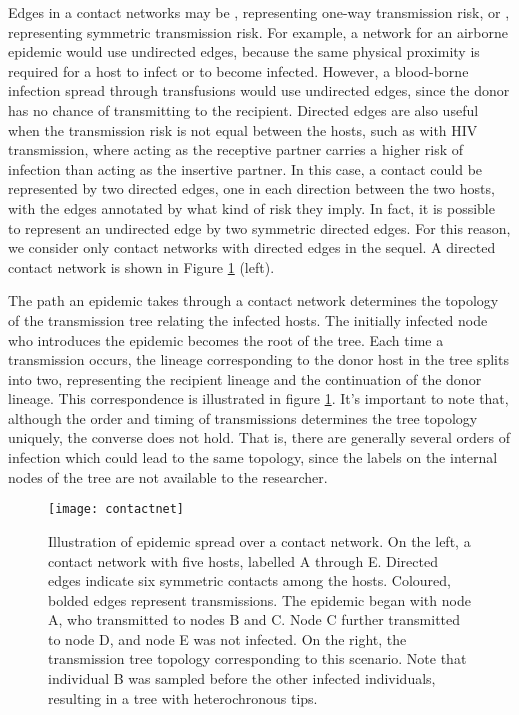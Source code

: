 Edges in a contact networks may be , representing one-way
transmission risk, or , representing symmetric transmission
risk. For example, a network for an airborne epidemic would use undirected
edges, because the same physical proximity is required for a host to infect or
to become infected. However, a blood-borne infection spread through
transfusions would use undirected edges, since the donor has no chance of
transmitting to the recipient. Directed edges are also useful when the
transmission risk is not equal between the hosts, such as with HIV
transmission, where acting as the receptive partner carries a higher risk of
infection than acting as the insertive partner. In this case, a contact could
be represented by two directed edges, one in each direction between the two
hosts, with the edges annotated by what kind of risk they imply. In fact, it is
possible to represent an undirected edge by two symmetric directed edges. For
this reason, we consider only contact networks with directed edges in the
sequel. A directed contact network is shown in Figure \ref{fig:contactnet}
(left).

The path an epidemic takes through a contact network determines the topology of
the transmission tree relating the infected hosts. The initially infected node
who introduces the epidemic becomes the root of the tree. Each time a
transmission occurs, the lineage corresponding to the donor host in the tree
splits into two, representing the recipient lineage and the continuation of the
donor lineage. This correspondence is illustrated in figure
\ref{fig:contactnet}. It's important to note that, although the order and
timing of transmissions determines the tree topology uniquely, the converse
does not hold. That is, there are generally several orders of infection which
could lead to the same topology, since the labels on the internal nodes of the
tree are not available to the researcher.

\begin{figure}[ht]
  \centering
  \label{fig:contactnet}
  \texttt{[image: contactnet]}
  \caption[Illustration of a epidemic spread over a contact network]
  {Illustration of epidemic spread over a contact network. On the left, a
   contact network with five hosts, labelled A through E. Directed edges
   indicate six symmetric contacts among the hosts. Coloured, bolded edges
   represent transmissions. The epidemic began with node A, who transmitted to
   nodes B and C. Node C further transmitted to node D, and node E was not
   infected. On the right, the transmission tree topology corresponding to this
   scenario. Note that individual B was sampled before the other infected
   individuals, resulting in a tree with heterochronous tips.}
\end{figure}

